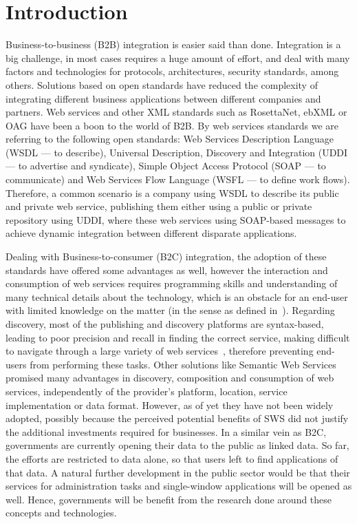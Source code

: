 
\section{Introduction}
\label{sec:introduction}

Business-to-business (B2B) integration is easier said than done. Integration is a big challenge, in most cases requires a huge amount of effort, and deal with many factors and technologies for protocols, architectures, security standards, among others. Solutions based on open standards have reduced the complexity of integrating different business applications between different companies and partners. Web services and other XML standards such as RosettaNet, ebXML or OAG have been a boon to the world of B2B. By web services standards we are referring to the following open standards: Web Services Description Language (WSDL --- to describe), Universal Description, Discovery and Integration (UDDI --- to advertise and syndicate), Simple Object Access Protocol (SOAP --- to communicate) and Web Services Flow Language (WSFL --- to define work flows). Therefore, a common scenario is a company using WSDL to describe its public and private web service, publishing them either using a public or private repository using UDDI, where these web services using SOAP-based messages to achieve dynamic integration between different disparate applications.

Dealing with Business-to-consumer (B2C) integration, the adoption of these standards have offered some advantages as well, however the interaction and consumption of web services requires programming skills and understanding of many technical details about the technology, which is an obstacle for an end-user with limited knowledge on the matter (in the sense as defined in~\cite{fuchsloch2010}). 
Regarding discovery, most of the publishing and discovery platforms are syntax-based, leading to poor precision and recall in finding the correct service, making difficult to navigate through a large variety of web services~\cite{pilioura_acm2009}, 
therefore preventing end-users from performing these tasks. 
Other solutions like Semantic Web Services promised many advantages in discovery, composition and consumption of web services, independently of the provider's platform, location,  service implementation or data format. 
However, as of yet they have not been widely adopted, 
possibly because the perceived potential benefits of SWS did not justify the additional investments required for businesses. 
In a similar vein as B2C, governments are currently opening their data to the public as linked data. 
So far, the efforts are restricted to data alone, so that users left to find applications of that data. 
A natural further development in the public sector would be that their services for administration tasks and single-window applications will be opened as well. Hence, governments will be benefit from the research done around these concepts and technologies.

